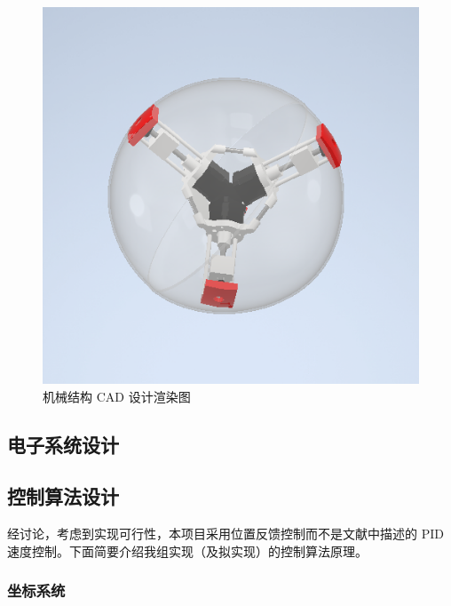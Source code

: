 \documentclass[a4paper]{ctexart}
\numberwithin{equation}{section}
\numberwithin{table}{section}
\numberwithin{figure}{section}
\begin{document}
\begin{figure}[H]
\begin{minipage}{0.32\linewidth}
\begin{center}
    \end{center}
  \end{minipage}
  \hfill
  \begin{minipage}{0.32\linewidth}
    \begin{center}
      \includegraphics[width=0.98\linewidth]{figures/rendered3.png}
    \end{center}
  \end{minipage}
  \caption{机械结构 CAD 设计渲染图}
\end{figure}

\subsection{电子系统设计}

\subsection{控制算法设计}

经讨论，考虑到实现可行性，本项目采用位置反馈控制而不是文献中描述的 PID 速度控制。下面简要介绍我组实现（及拟实现）的控制算法原理。

\subsubsection{坐标系统}
\end{document}
